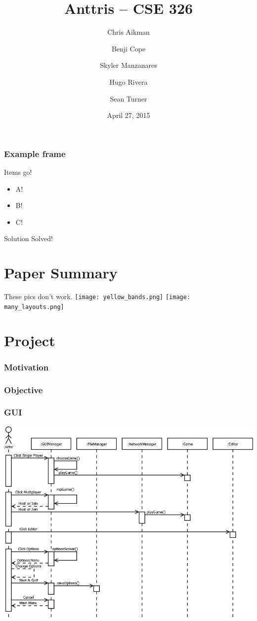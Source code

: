 \documentclass{beamer}
\title{Anttris -- CSE 326}
\author{%
\and Chris Aikman
\and Benji Cope
\and Skyler Manzanares
\and Hugo Rivera
\and Sean Turner}
\date{April 27, 2015}
\begin{document}
\begin{frame}
\titlepage
\end{frame}

\begin{frame}
    \frametitle{Example frame}
    Items go!
\begin{itemize}
\pause \item A!
\pause \item B!
\pause \item C!
\end{itemize}

\begin{alertblock}{Solution}
Solved!
\end{alertblock}

\end{frame}

\section{Paper Summary}
\begin{frame}
    These pics don't work.
\texttt{[image: yellow\_bands.png]}
\pause
\texttt{[image: many\_layouts.png]}
\end{frame}






\section{Project}

\begin{frame}
  \frametitle{Motivation} %
\end{frame}

\begin{frame}
  \frametitle{Objective} %
\end{frame}


\begin{frame}
    \frametitle{GUI} %
    \includegraphics[width=1\linewidth]{Anttris_GUISequence.png}
\end{frame}
\end{document}
